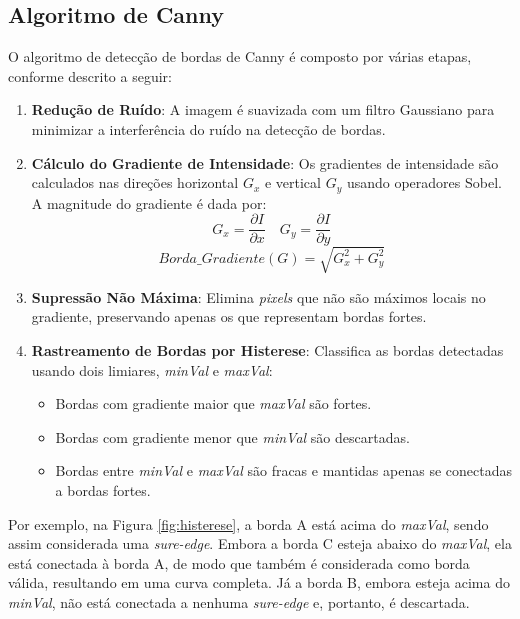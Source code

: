 \subsection{Algoritmo de Canny}

O algoritmo de detecção de bordas de Canny é composto por várias etapas, conforme descrito a seguir:

\begin{enumerate}
    \item \textbf{Redução de Ruído}: A imagem é suavizada com um filtro Gaussiano para minimizar a interferência do ruído na detecção de bordas.

    \item \textbf{Cálculo do Gradiente de Intensidade}: Os gradientes de intensidade são calculados nas direções horizontal \(G_x\) e vertical \(G_y\) usando operadores Sobel. A magnitude do gradiente é dada por:
    \[G_x = \frac{\partial I}{\partial x} \quad G_y = \frac{\partial I}{\partial y}\]
    \[Borda\_Gradiente(G) = \sqrt{G_{x}^{2} + G_{y}^{2}}\]

    \item \textbf{Supressão Não Máxima}: Elimina \textit{pixels} que não são máximos locais no gradiente, preservando apenas os que representam bordas fortes.

    \item \textbf{Rastreamento de Bordas por Histerese}: Classifica as bordas detectadas usando dois limiares, \textit{minVal} e \textit{maxVal}:
    \begin{itemize}
        \item Bordas com gradiente maior que \textit{maxVal} são fortes.
        \item Bordas com gradiente menor que \textit{minVal} são descartadas.
        \item Bordas entre \textit{minVal} e \textit{maxVal} são fracas e mantidas apenas se conectadas a bordas fortes.
    \end{itemize}
\end{enumerate}

Por exemplo, na Figura \autoref{fig:histerese}, a borda A está acima do \textit{maxVal}, sendo assim considerada uma \textit{sure-edge}. Embora a borda C esteja abaixo do \textit{maxVal}, ela está conectada à borda A, de modo que também é considerada como borda válida, resultando em uma curva completa. Já a borda B, embora esteja acima do \textit{minVal}, não está conectada a nenhuma \textit{sure-edge} e, portanto, é descartada.

